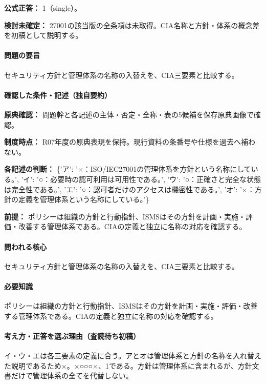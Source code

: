 \textbf{公式正答：} 1（single）。

\par\textbf{検討未確定：} 27001の該当版の全条項は未取得。CIA名称と方針・体系の概念差を初稿として説明する。

\paragraph{問題の要旨} セキュリティ方針と管理体系の名称の入替えを、CIA三要素と比較する。

\paragraph{確認した条件・記述（独自要約）}\mbox{}\par

\noindent\textbf{原典確認：} 問題幹と各記述の主体・否定・全称・表の5候補を保存原典画像で確認。\par

\noindent\textbf{制度時点：} R07年度の原典表現を保持。現行資料の条番号や仕様を過去へ補わない。\par

\noindent\textbf{各記述の判断：} \{'ア': '×：ISO/IEC27001の管理体系を方針という名称にしている。', 'イ': '○：必要時の認可利用は可用性である。', 'ウ': '○：正確さと完全な状態は完全性である。', 'エ': '○：認可者だけのアクセスは機密性である。', 'オ': '×：方針の定義を管理体系という名称にしている。'\}\par

\noindent\textbf{前提：} ポリシーは組織の方針と行動指針、ISMSはその方針を計画・実施・評価・改善する管理体系である。CIAの定義と独立に名称の対応を確認する。\par

\paragraph{問われる核心} セキュリティ方針と管理体系の名称の入替えを、CIA三要素と比較する。

\paragraph{必要知識} ポリシーは組織の方針と行動指針、ISMSはその方針を計画・実施・評価・改善する管理体系である。CIAの定義と独立に名称の対応を確認する。

\paragraph{考え方・正答を選ぶ理由（査読待ち初稿）} イ・ウ・エは各三要素の定義に合う。アとオは管理体系と方針の名称を入れ替えた説明であるため×。×○○○×、1である。方針は管理体系に含まれるが、方針文書だけで管理体系の全てを代替しない。

